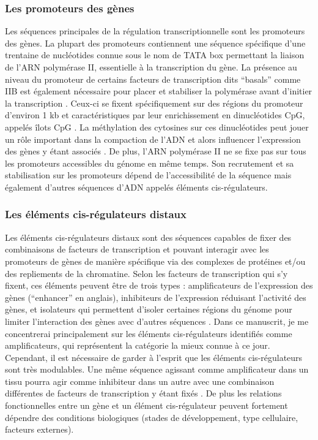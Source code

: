 \subsubsection{Les promoteurs des gènes}
\label{subsubsec:prom}

Les séquences principales de la régulation transcriptionnelle sont les promoteurs des gènes. La plupart des promoteurs contiennent une séquence spécifique d’une trentaine de nucléotides connue sous le nom de TATA box permettant la liaison de l’ARN polymérase II, essentielle à la transcription du gène. La présence au niveau du promoteur de certains facteurs de transcription dits “basals” comme IIB est également nécessaire pour placer et stabiliser la polymérase avant d’initier la transcription \citep{kostrewa_rna_2009}. Ceux-ci se fixent spécifiquement sur des régions du promoteur d’environ 1 kb et caractéristiques par leur enrichissement en dinucléotides \acrshort{CpG}, appelés îlots \acrshort{CpG} \citep{down_computational_2002, deaton_cpg_2011}. La méthylation des cytosines sur ces dinucléotides peut jouer un rôle important dans la compaction de l’ADN et alors influencer l’expression des gènes y étant associés \citep{moore_dna_2013}. De plus, l’ARN polymérase II ne se fixe pas sur tous les promoteurs accessibles du génome en même temps. Son recrutement et sa stabilisation sur les promoteurs dépend de l’accessibilité de la séquence mais également d’autres séquences d’ADN appelés éléments \gls{cis}-régulateurs.

\subsubsection{Les éléments \gls{cis}-régulateurs distaux}
\label{subsubsec:cis-reg}

Les éléments \gls{cis}-régulateurs distaux sont des séquences capables de fixer des combinaisons de facteurs de transcription et pouvant interagir avec les promoteurs de gènes de manière spécifique via des complexes de protéines et/ou des repliements de la chromatine. Selon les facteurs de transcription qui s’y fixent, ces éléments peuvent être de trois types : \glspl{amplificateur} de l’expression des gènes (“enhancer” en anglais), inhibiteurs de l’expression réduisant l’activité des gènes, et isolateurs qui permettent d’isoler certaines régions du génome pour limiter l’interaction des gènes avec d’autres séquences \citep{maston_transcriptional_2006}. Dans ce manuscrit, je me concentrerai principalement sur les éléments \gls{cis}-régulateurs identifiés comme \glspl{amplificateur}, qui représentent la catégorie la mieux connue à ce jour. Cependant, il est nécessaire de garder à l’esprit que les éléments \gls{cis}-régulateurs sont très modulables. Une même séquence agissant comme \gls{amplificateur} dans un tissu pourra agir comme inhibiteur dans un autre avec une combinaison différentes de facteurs de transcription y étant fixés \citep{gisselbrecht_transcriptional_2020, huang_enhancer-silencer_2022}. De plus les relations fonctionnelles entre un gène et un élément \gls{cis}-régulateur peuvent fortement dépendre des \glspl{condition} biologiques (stades de développement, type cellulaire, facteurs externes). \\

